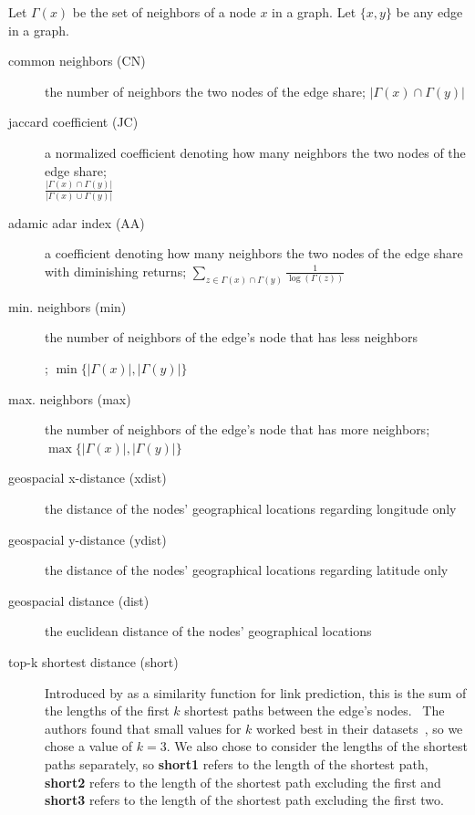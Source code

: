 \documentclass[12pt,a4paper]{IEEEtran}
\begin{document}
Let \(\Gamma(x)\) be the set of neighbors of a node \(x\) in a graph.
Let \(\{x,y\}\) be any edge in a graph.
\begin{description}
\item[common neighbors (CN)] the number of neighbors the two nodes of the edge share;
      \(|\Gamma(x) \cap \Gamma(y)|\)
\item[jaccard coefficient (JC)] a normalized coefficient denoting how many neighbors the two nodes of the edge share;\\
      \(\frac{|\Gamma(x) \cap \Gamma(y)|}{|\Gamma(x) \cup \Gamma(y)|}\)
\item[adamic adar index (AA)] a coefficient denoting how many neighbors the two nodes of the edge share with diminishing returns;
      \(\sum_{z \in \Gamma(x) \cap \Gamma(y)}\frac{1}{\log(\Gamma(z))}\)
\item[min. neighbors (min)] the number of neighbors of the edge's node that has less neighbors\endnotemark\addtocounter{endnote}{-1};
      \(\min\{|\Gamma(x)|,|\Gamma(y)|\}\)
\item[max. neighbors (max)] the number of neighbors of the edge's node that has more neighbors\endnotemark;
      \(\max\{|\Gamma(x)|,|\Gamma(y)|\}\)
\item[geospacial x-distance (xdist)] the distance of the nodes' geographical locations regarding longitude only
\item[geospacial y-distance (ydist)] the distance of the nodes' geographical locations regarding latitude only
\item[geospacial distance (dist)] the euclidean distance of the nodes' geographical locations
\item[top-k shortest distance (short)] Introduced by \citeauthor{link_prediction_k_shortest}
      as a similarity function for link prediction,
      this is the sum of the lengths of the first \(k\) shortest paths between the edge's nodes.~\cite{link_prediction_k_shortest}
      The authors found that small values for \(k\) worked best in their datasets~\cite[see][4]{link_prediction_k_shortest},
      so we chose a value of \(k = 3\).
      We also chose to consider the lengths of the shortest paths separately,
      so \textbf{short1} refers to the length of the shortest path,
      \textbf{short2} refers to the length of the shortest path excluding the first and
      \textbf{short3} refers to the length of the shortest path excluding the first two.
\end{description}
\end{document}
